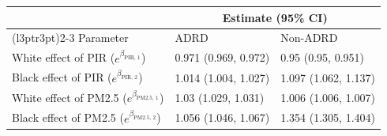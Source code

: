 
\begin{tabular}{lll}
\toprule
\multicolumn{1}{c}{ } & \multicolumn{2}{c}{Estimate (95\% CI)} \\
\cmidrule(l{3pt}r{3pt}){2-3}
Parameter & ADRD & Non-ADRD\\
\midrule
White effect of PIR ($e^{\beta_{\text{PIR, 1}}}$) & 0.971 (0.969, 0.972) & 0.95 (0.95, 0.951)\\
Black effect of PIR ($e^{\beta_{\text{PIR, 2}}}$) & 1.014 (1.004, 1.027) & 1.097 (1.062, 1.137)\\
White effect of PM2.5 ($e^{\beta_{\text{PM2.5, 1}}}$) & 1.03 (1.029, 1.031) & 1.006 (1.006, 1.007)\\
Black effect of PM2.5 ($e^{\beta_{\text{PM2.5, 2}}}$) & 1.056 (1.046, 1.067) & 1.354 (1.305, 1.404)\\
\bottomrule
\end{tabular}
